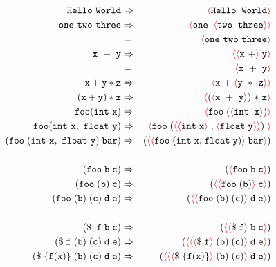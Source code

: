 \documentclass{article}
\newcommand{\fopen}{{\color{red} \langle}}
\newcommand{\fclose}{{\color{red} \rangle}}
\begin{document}
\begin{figure}
\begin{eqnarray*}
  \mathtt{Hello~World} & \Rightarrow & \fopen \mathtt{Hello}\;\; \mathtt{World}\fclose \\
  \mathtt{one~two~three} & \Rightarrow & \fopen \mathtt{one}\;\; \fopen \mathtt{two} \; \;\mathtt{three}\fclose\fclose \\
   & = & \fopen \mathtt{one~two~three} \fclose \\
  \mathtt{x~+~y} & \Rightarrow & \fopen\fopen \mathtt{x~+}\fclose\;\mathtt{y}\fclose \\
  & = & \fopen \mathtt{x~+~y} \fclose \\
  \mathtt{x+y*z} & \Rightarrow & \fopen \mathtt{x~+}\; \fopen \mathtt{y~*~z} \fclose\fclose \\
  \mathtt{(x+y)*z} & \Rightarrow & \fopen (\fopen \mathtt{x~+~y} \fclose )\;\mathtt{*~z}\fclose \\
  \mathtt{foo}(\mathtt{int~x}) & \Rightarrow & \fopen \mathtt{foo}\; (\fopen \mathtt{int}\;  \; \mathtt{x}\fclose)\fclose \\
  \mathtt{foo(int~x,~float~y)} & \Rightarrow & \fopen \mathtt{foo} \; (\fopen\fopen \mathtt{int}\; \mathtt{x} \fclose\;
  \mathtt{,}\; \fopen\mathtt{float} \; \mathtt{y} \fclose\fclose )\;\fclose \\
  \mathtt{(foo\; (int~x,~float~y)\; bar)} & \Rightarrow & (\fopen \fopen \mathtt{foo} \; (\mathtt{int}\; \mathtt{x}
  \mathtt{,}\; \mathtt{float} \; \mathtt{y})\fclose\;{\tt bar}\fclose) \\
  \\
  \mathtt{(foo\; b\;c)} & \Rightarrow & (\fopen \mathtt{foo\;b\;c}\fclose)   \\
  \mathtt{(foo\; (b)\;c)} & \Rightarrow & (\fopen \fopen \mathtt{foo} \; (\mathtt{b})\fclose\;{\tt c}\fclose) \\
  \mathtt{(foo\; (b)\;(c)\; d\;e)} & \Rightarrow & (\fopen \fopen \mathtt{foo} \; (\mathtt{b})\;({\tt c})\fclose\;{\tt d\;e}\fclose)  \\
  \\
  \mathtt{(\$\; \;f\; b\;c)} & \Rightarrow & (\fopen\fopen\$\; \mathtt{f}\fclose\; \mathtt{b}\;{\tt c}\fclose)   \\
  \mathtt{(\$\; f\; (b)\;(c)\;d\;e)} & \Rightarrow &
  (\fopen \fopen \fopen\$\; \mathtt{f}\fclose \; (\mathtt{b})\;({\tt c})\fclose\;{\tt d\;e}\fclose) \\
  \mathtt{(\$\; \{f(x)\}\;(b)\;(c)\;d\;e)} & \Rightarrow &
  (\fopen \fopen \fopen\$\; \{\mathtt{f(x)}\}\fclose \; (\mathtt{b})\;({\tt c})\fclose\;{\tt d\;e}\fclose)
\end{eqnarray*}


\end{figure}
\end{document}
